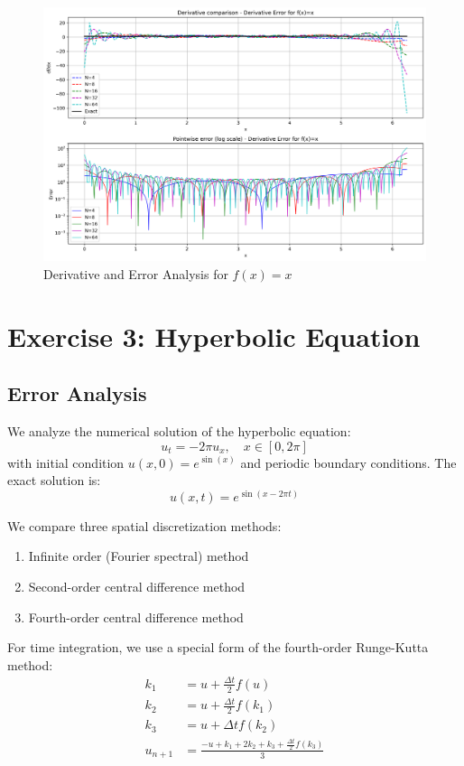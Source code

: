 \documentclass{article}
\begin{document}
\begin{figure}[h]
\centering
\includegraphics[width=1\textwidth]{figures/Derivative_Error_for_fxDerivative_Error_for_f_x__x}
\caption{Derivative and Error Analysis for $f(x)=x$}
\end{figure}


\clearpage
\section{Exercise 3: Hyperbolic Equation}

\subsection{Error Analysis}
We analyze the numerical solution of the hyperbolic equation:
\[
u_t = -2\pi u_x, \quad x \in [0,2\pi]
\]
with initial condition $u(x,0) = e^{\sin(x)}$ and periodic boundary conditions. The exact solution is:
\[
u(x,t) = e^{\sin(x-2\pi t)}
\]

We compare three spatial discretization methods:
\begin{enumerate}
    \item Infinite order (Fourier spectral) method
    \item Second-order central difference method
    \item Fourth-order central difference method
\end{enumerate}

For time integration, we use a special form of the fourth-order Runge-Kutta method:
\[
\begin{aligned}
k_1 &= u + \frac{\Delta t}{2}f(u) \\
k_2 &= u + \frac{\Delta t}{2}f(k_1) \\
k_3 &= u + \Delta t f(k_2) \\
u_{n+1} &= \frac{-u + k_1 + 2k_2 + k_3 + \frac{\Delta t}{2}f(k_3)}{3}
\end{aligned}
\]
\end{document}
